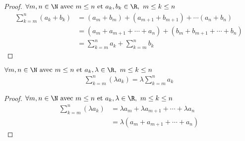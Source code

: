 \begin{proof}
	$\forall m, n \in \N \text{ avec } m \leq n \textnormal{ et } a_k, b_k \in \R, \ m \leq k \leq n$
	\begin{align*}
		\sum_{k = m}^{n} (a_k + b_k) &= (a_m + b_m) + (a_{m+1} + b_{m+1}) + \cdots (a_n + b_n)\\
		&= (a_m + a_{m+1} + \cdots + a_n) + (b_m + b_{m+1} + \cdots + b_n) \\
		&= \sum_{k=m}^{n}a_k + \sum_{k=m}^{n}b_k
	\end{align*}
\end{proof}

\begin{graybox}
	\begin{proposition}
		$\forall m, n \in \N \textnormal{ avec } m \leq n \textnormal{ et } a_k, \lambda \in \R, \ m \leq k \leq n$
		\begin{align*}
			\sum_{k = m}^{n} (\lambda a_k) = \lambda \sum_{k = m}^{n} a_k	
		\end{align*}
	\end{proposition}
\end{graybox}

\begin{proof}
	$\forall m, n \in \N \textnormal{ avec } m \leq n \textnormal{ et } a_k, \lambda \in \R, \ m \leq k \leq n$
	\begin{align*}
		\sum_{k = m}^{n} (\lambda a_k) &=  \lambda a_m + \lambda a_{m+1} + \cdots + \lambda a_n \\
		&= \lambda (a_m + a_{m+1} + \cdots + a_n)
	\end{align*}
\end{proof}
